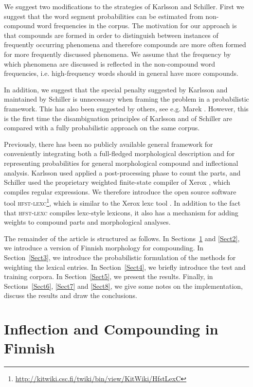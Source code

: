 \documentclass[11pt]{article}
\begin{document}
We suggest two modifications to the strategies of Karlsson and
Schiller. First we suggest that the word segment probabilities can be
estimated from non-compound word frequencies in the corpus. The
motivation for our approach is that compounds are formed in order to
distinguish between instances of frequently occurring phenomena and
therefore compounds are more often formed for more frequently
discussed phenomena. We assume that the frequency by which phenomena
are discussed is reflected in the non-compound word frequencies,
i.e. high-frequency words should in general have more compounds.

In addition, we suggest that the special penalty suggested by Karlsson
and maintained by Schiller is unnecessary when framing the problem in
a probabilistic framework. This has also been suggested by others, see
e.g. Marek . However, this is the first time the
disambiguation principles of Karlsson and of Schiller are compared
with a fully probabilistic approach on the same corpus.

Previously, there has been no publicly available general framework for
conveniently integrating both a full-fledged morphological description
and for representing probabilities for general morphological compound
and inflectional analysis. Karlsson  used
applied a post-processing phase to count the parts, and Schiller
 used the proprietary weighted finite-state compiler
of Xerox \cite{kempe/2003}, which compiles regular expressions. We
therefore introduce the open source software tool
\textsc{hfst-lexc}\footnote{\url{http://kitwiki.csc.fi/twiki/bin/view/KitWiki/HfstLexC}},
which is similar to the Xerox lexc tool \cite{beesley/2003}. In
addition to the fact that \textsc{hfst-lexc} compiles lexc-style
lexicons, it also has a mechanism for adding weights to compound parts
and morphological analyses.

The remainder of the article is structured as follows. In
Sections~\ref{Sect1} and \ref{Sect2}, we introduce a version of
Finnish morphology for compounding. In Section~\ref{Sect3}, we
introduce the probabilistic formulation of the methods for weighting
the lexical entries. In Section~\ref{Sect4}, we briefly introduce the
test and training corpora. In Section~\ref{Sect5}, we present the
results. Finally, in Sections~\ref{Sect6}, \ref{Sect7} and
\ref{Sect8}, we give some notes on the implementation, discuss the
results and draw the conclusions.

\section{Inflection and Compounding in Finnish}
\label{Sect1}
\end{document}
